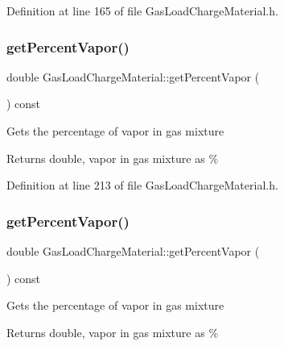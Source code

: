 Definition at line 165 of file Gas\+Load\+Charge\+Material.\+h.

\mbox{\label{class_gas_load_charge_material_a19b8ecfad235b5824b0a88903cff667a}} 
\subsubsection{\texorpdfstring{get\+Percent\+Vapor()}{getPercentVapor()}\hspace{0.1cm}{\footnotesize\ttfamily [1/3]}}
{\footnotesize\ttfamily double Gas\+Load\+Charge\+Material\+::get\+Percent\+Vapor (\begin{DoxyParamCaption}{ }\end{DoxyParamCaption}) const\hspace{0.3cm}{\ttfamily [inline]}}

Gets the percentage of vapor in gas mixture \begin{DoxyReturn}{Returns}
double, vapor in gas mixture as \% 
\end{DoxyReturn}


Definition at line 213 of file Gas\+Load\+Charge\+Material.\+h.

\mbox{\label{class_gas_load_charge_material_a19b8ecfad235b5824b0a88903cff667a}} 
\subsubsection{\texorpdfstring{get\+Percent\+Vapor()}{getPercentVapor()}\hspace{0.1cm}{\footnotesize\ttfamily [2/3]}}
{\footnotesize\ttfamily double Gas\+Load\+Charge\+Material\+::get\+Percent\+Vapor (\begin{DoxyParamCaption}{ }\end{DoxyParamCaption}) const\hspace{0.3cm}{\ttfamily [inline]}}

Gets the percentage of vapor in gas mixture \begin{DoxyReturn}{Returns}
double, vapor in gas mixture as \% 
\end{DoxyReturn}



